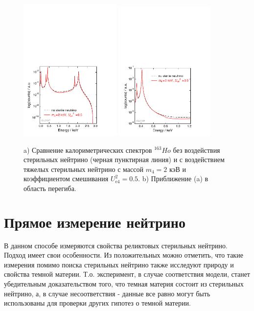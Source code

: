 \documentclass[a4paper,14pt]{extreport}
\begin{document}
\begin{figure}
  \centering
  \includegraphics[width = 0.45\textwidth]{img/electron_capture/ste_full_spe.pdf}
  \includegraphics[width = 0.44\textwidth]{img/electron_capture/ste_det_spe.pdf}
    \caption{a) Сравнение калориметрических спектров $ ^{163}Ho $ без воздействия стерильных нейтрино (черная пунктирная линия) и с воздействием тяжелых стерильных нейтрино с массой $m_4=2$ кэВ и коэффициентом смешивания $U_{\mathrm{e4}}^2 = 0.5$. b) Приближение (a) в область перегиба.}
    \label{fig:ste-kink}
\end{figure}

\section{Прямое измерение нейтрино}

В данном способе измеряются свойства реликтовых стерильных нейтрино. Подход имеет свои особенности. Из положительных можно отметить, что такие измерения помимо поиска стерильных нейтрино также исследуют природу и свойства темной материи. Т.о. эксперимент, в случае соответствия модели, станет убедительным доказательством того, что темная материя состоит из стерильных нейтрино, а, в случае несоответствия - данные все равно могут быть использованы для проверки других гипотез о темной материи.
\end{document}
